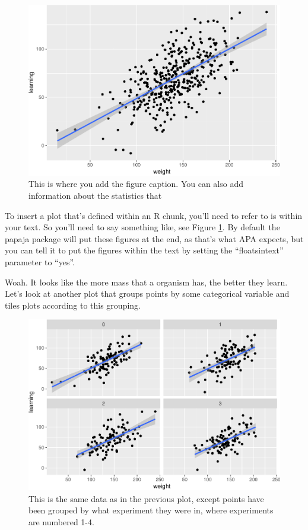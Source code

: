 \documentclass[man,floatsintext]{apa6}
\begin{document}
\begin{figure}
\centering
\includegraphics{tutorial_files/figure-latex/weight-and-learning-1.pdf}
\caption{\label{fig:weight-and-learning}This is where you add the figure caption. You can also add information about the statistics that}
\end{figure}

To insert a plot that's defined within an R chunk, you'll need to refer to is within your text. So you'll need to say something like, see Figure \ref{fig:weight-and-learning}. By default the papaja package will put these figures at the end, as that's what APA expects, but you can tell it to put the figures within the text by setting the \enquote{floatsintext} parameter to \enquote{yes}.

Woah. It looks like the more mass that a organism has, the better they learn. Let's look at another plot that groups points by some categorical variable and tiles plots according to this grouping.

\begin{figure}
\centering
\includegraphics{tutorial_files/figure-latex/tiled-weight-1.pdf}
\caption{\label{fig:tiled-weight}This is the same data as in the previous plot, except points have been grouped by what experiment they were in, where experiments are numbered 1-4.}
\end{figure}
\end{document}
